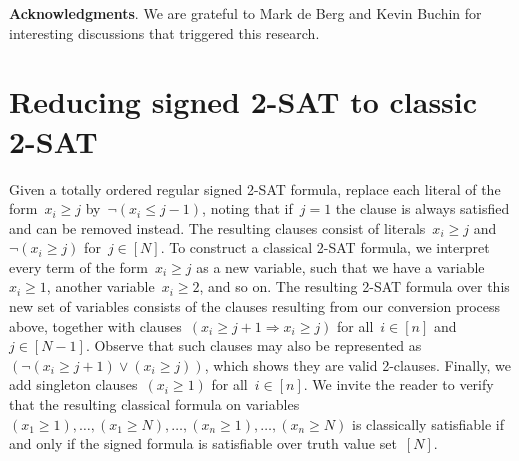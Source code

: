 \let\accentvec\vec  \documentclass{llncs}
\begin{document}
\textbf{Acknowledgments}. We are grateful to Mark de Berg and Kevin Buchin for interesting discussions that triggered this research.




\clearpage

\appendix

\section{Reducing signed 2-SAT to classic 2-SAT} \label{app:twosat}
Given a totally ordered regular signed 2-SAT formula, replace each literal of the form~$x_i \geq j$ by~$\neg (x_i \leq j-1)$, noting that if~$j = 1$ the clause is always satisfied and can be removed instead. The resulting clauses consist of literals~$x_i \geq j$ and~$\neg (x_i \geq j)$ for~$j \in [N]$. To construct a classical 2-SAT formula, we interpret every term of the form~$x_i \geq j$ as a new variable, such that we have a variable~$x_i \geq 1$, another variable~$x_i \geq 2$, and so on. The resulting 2-SAT formula over this new set of variables consists of the clauses resulting from our conversion process above, together with clauses~$(x_i \geq j+1 \Rightarrow x_i \geq j)$ for all~$i \in [n]$ and~$j \in [N-1]$. Observe that such clauses may also be represented as~$(\neg (x_i \geq j+1) \vee (x_i \geq j))$, which shows they are valid 2-clauses. Finally, we add singleton clauses~$(x_i \geq 1)$ for all~$i \in [n]$. We invite the reader to verify that the resulting classical formula on variables~$(x_1 \geq 1), \ldots, (x_1 \geq N), \ldots, (x_n \geq 1), \ldots, (x_n \geq N)$ is classically satisfiable if and only if the signed formula is satisfiable over truth value set~$[N]$.
\end{document}

